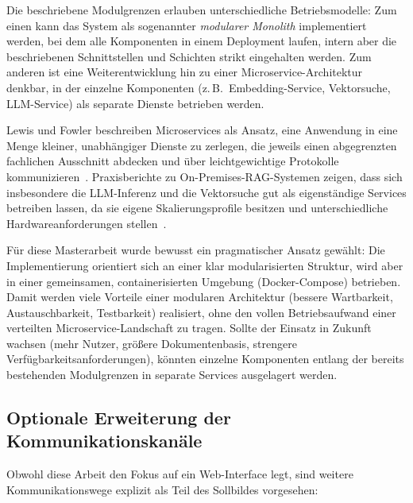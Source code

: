 Die beschriebene Modulgrenzen erlauben unterschiedliche Betriebsmodelle:
Zum einen kann das System als sogenannter \emph{modularer Monolith} implementiert werden, bei dem alle Komponenten in einem Deployment laufen, intern aber die beschriebenen Schnittstellen und Schichten strikt eingehalten werden.
Zum anderen ist eine Weiterentwicklung hin zu einer Microservice-Architektur denkbar, in der einzelne Komponenten (z.\,B.\ Embedding-Service, Vektorsuche, LLM-Service) als separate Dienste betrieben werden.

Lewis und Fowler beschreiben Microservices als Ansatz, eine Anwendung in eine Menge kleiner, unabhängiger Dienste zu zerlegen, die jeweils einen abgegrenzten fachlichen Ausschnitt abdecken und über leichtgewichtige Protokolle kommunizieren~\cite{LewisFowler2014Microservices}.
Praxisberichte zu On-Premises-RAG-Systemen zeigen, dass sich insbesondere die LLM-Inferenz und die Vektorsuche gut als eigenständige Services betreiben lassen, da sie eigene Skalierungsprofile besitzen und unterschiedliche Hardwareanforderungen stellen~\cite{RidgeRun2024OnPremRAG}.

Für diese Masterarbeit wurde bewusst ein pragmatischer Ansatz gewählt:
Die Implementierung orientiert sich an einer klar modularisierten Struktur, wird aber in einer gemeinsamen, containerisierten Umgebung (Docker-Compose) betrieben.
Damit werden viele Vorteile einer modularen Architektur (bessere Wartbarkeit, Austauschbarkeit, Testbarkeit) realisiert, ohne den vollen Betriebsaufwand einer verteilten Microservice-Landschaft zu tragen.
Sollte der Einsatz in Zukunft wachsen (mehr Nutzer, größere Dokumentenbasis, strengere Verfügbarkeitsanforderungen), könnten einzelne Komponenten entlang der bereits bestehenden Modulgrenzen in separate Services ausgelagert werden.

\subsection{Optionale Erweiterung der Kommunikationskanäle}\label{subsec:optionale-erweiterung-der-kommunikationskanale}

Obwohl diese Arbeit den Fokus auf ein Web-Interface legt, sind weitere Kommunikationswege explizit als Teil des Sollbildes vorgesehen:

